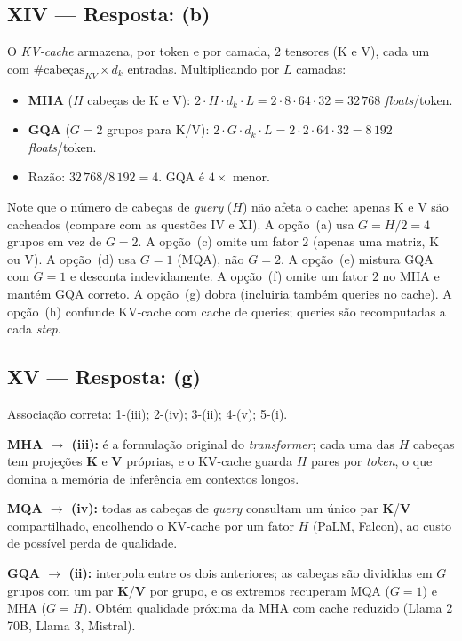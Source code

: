 \documentclass{dlproblemset}
\begin{document}
\subsection*{XIV — Resposta: (b)}
O \textit{KV-cache} armazena, por token e por camada, $2$ tensores (K e V), cada um com
$\#\text{cabeças}_{KV} \times d_k$ entradas. Multiplicando por $L$ camadas:
\begin{itemize}
    \item \textbf{MHA} ($H$ cabeças de K e V): $2 \cdot H \cdot d_k \cdot L = 2 \cdot 8 \cdot 64 \cdot 32 = 32\,768$ \textit{floats}/token.
    \item \textbf{GQA} ($G = 2$ grupos para K/V): $2 \cdot G \cdot d_k \cdot L = 2 \cdot 2 \cdot 64 \cdot 32 = 8\,192$ \textit{floats}/token.
    \item Razão: $32\,768 / 8\,192 = 4$. GQA é $4\times$ menor.
\end{itemize}
Note que o número de cabeças de \emph{query} ($H$) não afeta o cache: apenas K e V são
cacheados (compare com as questões IV e XI).
A opção~(a) usa $G = H/2 = 4$ grupos em vez de $G = 2$.
A opção~(c) omite um fator $2$ (apenas uma matriz, K ou V).
A opção~(d) usa $G = 1$ (MQA), não $G = 2$.
A opção~(e) mistura GQA com $G = 1$ e desconta indevidamente.
A opção~(f) omite um fator $2$ no MHA e mantém GQA correto.
A opção~(g) dobra (incluiria também queries no cache).
A opção~(h) confunde KV-cache com cache de queries; queries são recomputadas a cada
\textit{step}.

\subsection*{XV — Resposta: (g)}
Associação correta: 1-(iii); 2-(iv); 3-(ii); 4-(v); 5-(i).

\textbf{MHA $\to$ (iii):} é a formulação original do \textit{transformer}; cada uma das
$H$ cabeças tem projeções $\mathbf{K}$ e $\mathbf{V}$ próprias, e o KV-cache guarda $H$
pares por \textit{token}, o que domina a memória de inferência em contextos longos.

\textbf{MQA $\to$ (iv):} todas as cabeças de \textit{query} consultam um único par
$\mathbf{K}$/$\mathbf{V}$ compartilhado, encolhendo o KV-cache por um fator $H$ (PaLM,
Falcon), ao custo de possível perda de qualidade.

\textbf{GQA $\to$ (ii):} interpola entre os dois anteriores; as cabeças são divididas em
$G$ grupos com um par $\mathbf{K}$/$\mathbf{V}$ por grupo, e os extremos recuperam MQA
($G = 1$) e MHA ($G = H$). Obtém qualidade próxima da MHA com cache reduzido (Llama 2
70B, Llama 3, Mistral).
\end{document}
